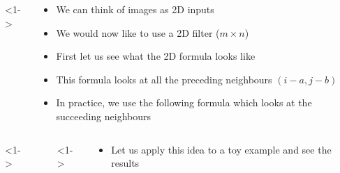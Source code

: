 \begin{frame}
\begin{columns}
		<1->
		\begin{overlayarea}{\textwidth}{\textheight}
			\begin{itemize}
				\justifying
				\item<1-> We can think of images as 2D inputs
				\item<2-> We would now like to use a 2D filter ($m \times n$)
				\item<3-> First let us see what the 2D formula looks like
				\item<4-> This formula looks at all the preceding neighbours $(i-a,j-b)$
				\item<5-> In practice, we use the following formula which looks at the succeeding neighbours
			\end{itemize}
		\end{overlayarea}
	\end{columns}
\end{frame}


\begin{frame}
	\begin{columns}
		<1->
		\begin{overlayarea}{\textwidth}{\textheight}
			\onslide<2->{
				
			}
		\end{overlayarea}
		        
		<1->
		\begin{overlayarea}{\textwidth}{\textheight}
			\begin{itemize}
				\justifying
				\item<1-> Let us apply this idea to a toy example and see the results
			\end{itemize}
		\end{overlayarea}
	\end{columns}
\end{frame}


